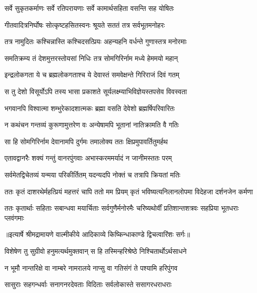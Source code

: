 \twolineshloka
{सर्वे सुकृतकर्माणः सर्वे रतिपरायणाः}
{सर्वे कामार्थसहिता वसन्ति सह योषितः} %

\twolineshloka
{गीतवादित्रनिर्घोषः सोत्कृष्टहसितस्वनः}
{श्रूयते सततं तत्र सर्वभूतमनोहरः} %

\twolineshloka
{तत्र नामुदितः कश्चिन्नास्ति कश्चिदसत्प्रियः}
{अहन्यहनि वर्धन्ते गुणास्तत्र मनोरमाः} %

\twolineshloka
{समतिक्रम्य तं देशमुत्तरस्तोयसां निधिः}
{तत्र सोमगिरिर्नाम मध्ये हेममयो महान्} %

\twolineshloka
{इन्द्रलोकगता ये च ब्रह्मलोकगताश्च ये}
{देवास्तं समवेक्षन्ते गिरिराजं दिवं गतम्} %

\twolineshloka
{स तु देशो विसूर्योऽपि तस्य भासा प्रकाशते}
{सूर्यलक्ष्म्याभिविज्ञेयस्तपसेव विवस्वता} %

\twolineshloka
{भगवानपि विश्वात्मा शम्भुरेकादशात्मकः}
{ब्रह्मा वसति देवेशो ब्रह्मर्षिपरिवारितः} %

\twolineshloka
{न कथंचन गन्तव्यं कुरूणामुत्तरेण वः}
{अन्येषामपि भूतानां नातिक्रामति वै गतिः} %

\twolineshloka
{सा हि सोमगिरिर्नाम देवानामपि दुर्गमः}
{तमालोक्य ततः क्षिप्रमुपावर्तितुमर्हथ} %

\twolineshloka
{एतावद्वानरैः शक्यं गन्तुं वानरपुंगवाः}
{अभास्करममर्यादं न जानीमस्ततः परम्} %

\twolineshloka
{सर्वमेतद्विचेतव्यं यन्मया परिकीर्तितम्}
{यदन्यदपि नोक्तं च तत्रापि क्रियतां मतिः} %

\fourlineindentedshloka
{ततः कृतं दाशरथेर्महत्प्रियं}
{ महत्तरं चापि ततो मम प्रियम्}
{कृतं भविष्यत्यनिलानलोपमा}
{ विदेहजा दर्शनजेन कर्मणा} %

\fourlineindentedshloka
{ततः कृतार्थाः सहिताः सबान्धवा}
{ मयार्चिताः सर्वगुणैर्मनोरमैः}
{चरिष्यथोर्वीं प्रतिशान्तशत्रवः}
{ सहप्रिया भूतधराः प्लवंगमाः} %


{॥इत्यार्षे श्रीमद्रामायणे वाल्मीकीये आदिकाव्ये किष्किन्धाकाण्डे द्विचत्वारिंशः सर्गः॥}


\twolineshloka
{विशेषेण तु सुग्रीवो हनुमत्यर्थमुक्तवान्}
{स हि तस्मिन्हरिश्रेष्ठे निश्चितार्थोऽर्थसाधने} %

\twolineshloka
{न भूमौ नान्तरिक्षे वा नाम्बरे नामरालये}
{नाप्सु वा गतिसंगं ते पश्यामि हरिपुंगव} %

\twolineshloka
{सासुराः सहगन्धर्वाः सनागनरदेवताः}
{विदिताः सर्वलोकास्ते ससागरधराधराः} %

